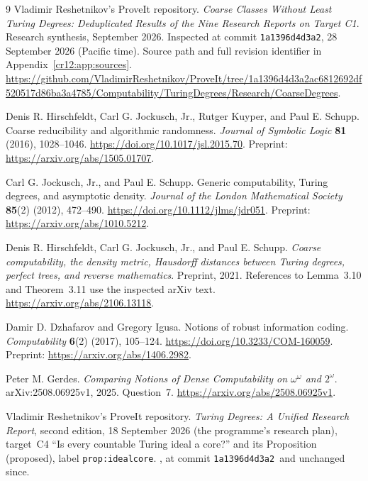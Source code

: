 \documentclass[11pt,letterpaper]{article}
\theoremstyle{plain}
\theoremstyle{definition}
\theoremstyle{remark}
\numberwithin{equation}{section}
\newcommand{\shortrepo}{\texttt{1a1396d4d3a2}}
\begin{document}
\begingroup\small\raggedright
\begin{thebibliography}{9}
Vladimir Reshetnikov's ProveIt repository.
\emph{Coarse Classes Without Least Turing Degrees: Deduplicated Results of the
Nine Research Reports on Target C1}. Research synthesis, September 2026.
Inspected at commit \shortrepo, 28 September 2026 (Pacific time).
Source path and full revision identifier in Appendix~\ref{cr12:app:sources}.
\url{https://github.com/VladimirReshetnikov/ProveIt/tree/1a1396d4d3a2ac6812692df520517d86ba3a4785/Computability/TuringDegrees/Research/CoarseDegrees}.

Denis R. Hirschfeldt, Carl G. Jockusch, Jr., Rutger Kuyper, and Paul E. Schupp.
Coarse reducibility and algorithmic randomness.
\emph{Journal of Symbolic Logic} \textbf{81} (2016), 1028--1046.
\url{https://doi.org/10.1017/jsl.2015.70}.
Preprint: \url{https://arxiv.org/abs/1505.01707}.

Carl G. Jockusch, Jr., and Paul E. Schupp.
Generic computability, Turing degrees, and asymptotic density.
\emph{Journal of the London Mathematical Society} \textbf{85}(2) (2012), 472--490.
\url{https://doi.org/10.1112/jlms/jdr051}.
Preprint: \url{https://arxiv.org/abs/1010.5212}.

Denis R. Hirschfeldt, Carl G. Jockusch, Jr., and Paul E. Schupp.
\emph{Coarse computability, the density metric, Hausdorff distances between
Turing degrees, perfect trees, and reverse mathematics}.
Preprint, 2021. References to Lemma~3.10 and Theorem~3.11 use the inspected
arXiv text.
\url{https://arxiv.org/abs/2106.13118}.

Damir D. Dzhafarov and Gregory Igusa.
Notions of robust information coding.
\emph{Computability} \textbf{6}(2) (2017), 105--124.
\url{https://doi.org/10.3233/COM-160059}.
Preprint: \url{https://arxiv.org/abs/1406.2982}.

Peter M. Gerdes.
\emph{Comparing Notions of Dense Computability on $\omega^\omega$ and
$2^\omega$}. arXiv:2508.06925v1, 2025. Question~7.
\url{https://arxiv.org/abs/2508.06925v1}.

Vladimir Reshetnikov's ProveIt repository.
\emph{Turing Degrees: A Unified Research Report}, second edition, 18 September 2026
(the programme's research plan), target~C4 ``Is every countable Turing ideal a
core?'' and its Proposition (proposed), label \texttt{prop:idealcore}.
,
at commit \shortrepo\ and unchanged since.


\end{thebibliography}
\end{document}
